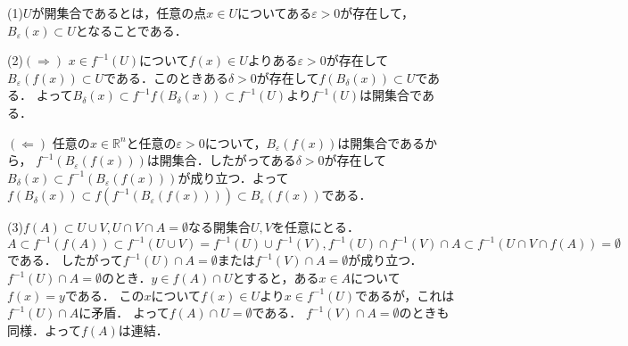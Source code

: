 \documentclass[
		book,
		head_space=20mm,
		foot_space=20mm,
		gutter=10mm,
		line_length=190mm
]{jlreq}
\begin{document}
(1)$U$が開集合であるとは，任意の点$x\in U$についてある$\varepsilon>0$が存在して，$B_\varepsilon(x)\subset U$となることである．

(2)$(\Rightarrow)$
$x\in f^{-1}(U)$について$f(x)\in U$よりある$\varepsilon>0$が存在して$B_\varepsilon(f(x))\subset U$である．このときある$\delta>0$が存在して$f(B_\delta(x))\subset U$である．
よって$B_{\delta}(x)\subset f^{-1}f(B_{\delta}(x))\subset f^{-1}(U)$より$f^{-1}(U)$は開集合である．

$(\Leftarrow)$
任意の$x\in \mathbb{R}^n$と任意の$\varepsilon>0$について，$B_\varepsilon(f(x))$は開集合であるから，
$f^{-1}(B_\varepsilon(f(x)))$は開集合．したがってある$\delta>0$が存在して$B_\delta(x)\subset f^{-1}(B_\varepsilon(f(x)))$が成り立つ．よって$f(B_\delta(x))\subset f(f^{-1}(B_\varepsilon(f(x)))) \subset B_\varepsilon(f(x))$である．

(3)$f(A)\subset U\cup V,U\cap V\cap A=\emptyset$なる開集合$U,V$を任意にとる．
$A\subset f^{-1}(f(A))\subset f^{-1}(U\cup V)=f^{-1}(U)\cup f^{-1}(V),f^{-1}(U)\cap f^{-1}(V)\cap A\subset f^{-1}(U\cap V\cap f(A))=\emptyset$である．
したがって$f^{-1}(U)\cap A=\emptyset$または$f^{-1}(V)\cap A=\emptyset$が成り立つ．
$f^{-1}(U)\cap A=\emptyset$のとき．$y\in f(A)\cap U$とすると，ある$x\in A$について$f(x)=y$である．
この$x$について$f(x)\in U$より$x\in f^{-1}(U)$であるが，これは$f^{-1}(U)\cap A$に矛盾．
よって$f(A)\cap U=\emptyset$である．
$f^{-1}(V)\cap A=\emptyset$のときも同様．よって$f(A)$は連結．
\end{document}
